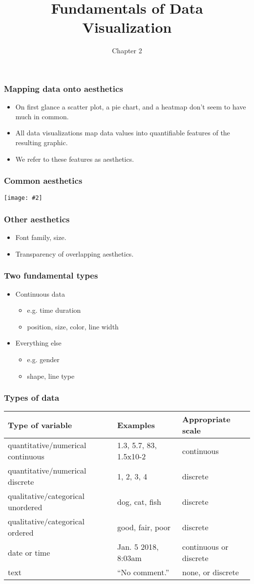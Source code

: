 \documentclass{beamer}
\title{Fundamentals of Data Visualization}
\author{Chapter 2}
\newcommand{\bi}{\begin{itemize}}
\newcommand{\li}{\item}
\newcommand{\ei}{\end{itemize}}
\newcommand{\fig}[2]{\centerline{\texttt{[image: \#2]}}}
\newcommand{\bfr}[1]{\begin{frame}[fragile]\frametitle{{ #1 }}}
\begin{document}
\begin{frame}
\maketitle
\end{frame}

\bfr{Mapping data onto aesthetics}

\bi
\li
On first glance a scatter plot, a pie chart, and a heatmap don’t seem to have much in common.
\li
All data visualizations map data values into quantifiable features of the resulting graphic. 
\li
We refer to these features as aesthetics.
\ei

\end{frame}

\bfr{Common aesthetics}
\fig{1.0}{common-aesthetics-1}
\end{frame}

\bfr{Other aesthetics}
\bi
\li Font family, size.
\li Transparency of overlapping aesthetics.
\ei
\end{frame}

\bfr{Two fundamental types}
\bi
\li Continuous data
\bi
\li e.g. time duration
\li position, size, color, line width
\ei
\li Everything else
\bi
\li e.g. gender
\li shape, line type
\ei
\ei
\end{frame}

\bfr{Types of data}
\scriptsize
\begin{tabular}{lll}
Type of variable&	Examples&	Appropriate scale	\\\hline
quantitative/numerical continuous	&1.3, 5.7, 83, 1.5x10-2	& continuous	\\
quantitative/numerical discrete&	1, 2, 3, 4	&discrete	\\
qualitative/categorical unordered&	dog, cat, fish&	discrete\\
qualitative/categorical ordered &	good, fair, poor	&discrete	 \\
date or time	&Jan. 5 2018, 8:03am&	continuous or discrete	\\
text &	``No comment.''&	none, or discrete	\\
\end{tabular}


\end{frame}
\end{document}
